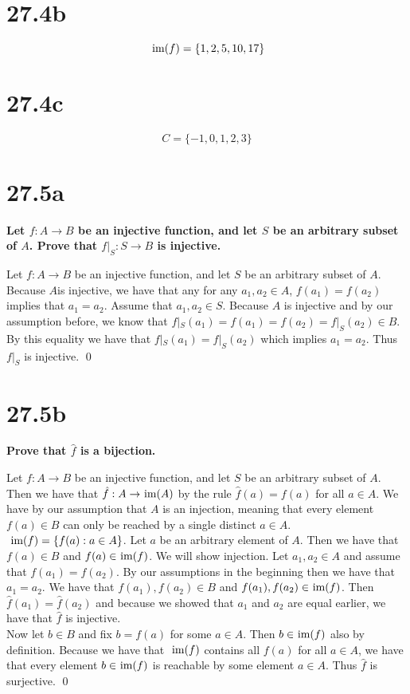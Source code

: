 \documentclass{article}
\begin{document}
\section*{27.4b}
\[
\im{f} = \{1, 2, 5, 10, 17\}
\]
\section*{27.4c}
\[
C = \{-1, 0, 1, 2, 3\}
\]

\section*{27.5a}
\textbf{Let $f: A \rightarrow B$ be an injective function, and let $S$ be an arbitrary subset of $A$. Prove that $f|_S: S \rightarrow B$ is injective.}\\

\bigskip

\proof Let $f: A \rightarrow B$ be an injective function, and let $S$ be an arbitrary subset of $A$. Because $A$is injective, we have that any for any $a_1, a_2 \in A$, $f(a_1) = f(a_2)$ implies that $a_1 = a_2$. Assume that $a_1, a_2 \in S$. Because $A$ is injective and by our assumption before, we know that $f|_S(a_1) = f(a_1) = f(a_2) = f|_S(a_2) \in B$. By this equality we have that $f|_S(a_1) = f|_S(a_2)$ which implies $a_1 = a_2$. Thus $f|_S$ is injective. \qed

\section*{27.5b}
\textbf{Prove that $\hat{f}$ is a bijection.}\\

\bigskip

\proof Let $f: A \rightarrow B$ be an injective function, and let $S$ be an arbitrary subset of $A$. Then we have that $\hat{f}: A \rightarrow \im{A}$ by the rule $\hat{f}(a) = f(a)$ for all $a \in A$. We have by our assumption that $A$ is an injection, meaning that every element$f(a) \in B$ can only be reached by a single distinct $a \in A$. $\im{f} = \{f(a) : a \in A\}$. Let $a$ be an arbitrary element of $A$. Then we have that $f(a) \in B$ and $f(a) \in \im{f}$.
We will show injection. Let $a_1, a_2 \in A$ and assume that $f(a_1) = f(a_2)$. By our assumptions in the beginning then we have that $a_1 = a_2$. We have that $f(a_1), f(a_2) \in B$ and $f(a_1), f(a_2) \in \im{f}$. Then $\hat{f}(a_1) = \hat{f}(a_2)$ and because we showed that $a_1$ and $a_2$ are equal earlier, we have that $\hat{f}$ is injective.\\
Now let $b \in B$ and fix $b = f(a)$ for some $a \in A$. Then $b \in \im{f}$ also by definition. Because we have that $\im{f}$ contains all $f(a)$ for all $a \in A$, we have that every element $b \in \im{f}$ is reachable by some element $a \in A$. Thus $\hat{f}$ is surjective. \qed
\end{document}
